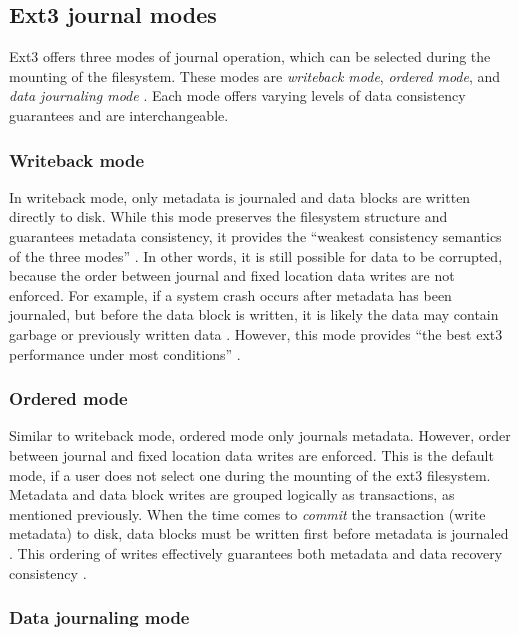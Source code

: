 \subsection{Ext3 journal modes}

Ext3 offers three modes of journal operation, which can be selected during the mounting of the filesystem. These modes are \emph{writeback mode}, \emph{ordered mode}, and \emph{data journaling mode} \citep{Prabhakaran2005a, Jones2008, Mauerer2008}. Each mode offers varying levels of data consistency guarantees and are interchangeable.

\subsubsection{Writeback mode}

In writeback mode, only metadata is journaled and data blocks are written directly to disk. While this mode preserves the filesystem structure and guarantees metadata consistency, it provides the ``weakest consistency semantics of the three modes'' \citep[p. 108]{Prabhakaran2005a}. In other words, it is still possible for data to be corrupted, because the order between journal and fixed location data writes are not enforced. For example, if a system crash occurs after metadata has been journaled, but before the data block is written, it is likely the data may contain garbage or previously written data \citep{Jones2008, Prabhakaran2005a}. However, this mode provides ``the best ext3 performance under most conditions'' \citep[p. 2]{Robbins2001b}.

\subsubsection{Ordered mode}

Similar to writeback mode, ordered mode only journals metadata. However, order between journal and fixed location data writes are enforced. This is the default mode, if a user does not select one during the mounting of the ext3 filesystem. Metadata and data block writes are grouped logically as transactions, as mentioned previously. When the time comes to \emph{commit} the transaction (write metadata) to disk, data blocks must be written first before metadata is journaled \citep{Robbins2001b}. This ordering of writes effectively guarantees both metadata and data recovery consistency \citep{Jones2008, Prabhakaran2005a}.

\subsubsection{Data journaling mode}

